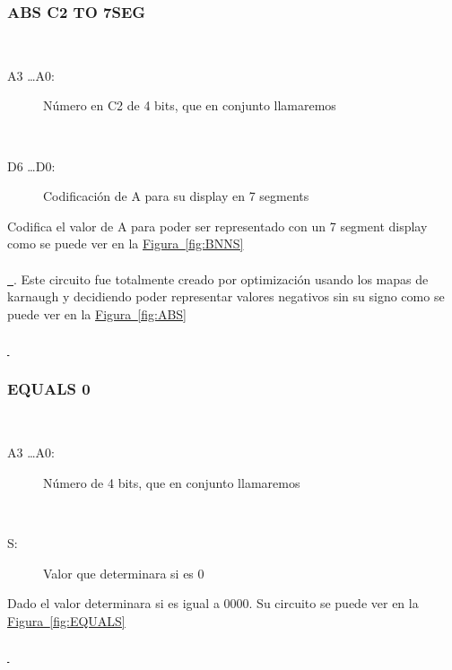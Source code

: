 \documentclass{article}
\newcommand*{\figref}[2][]{
  \hyperref[{fig:#2}]{
    Figura~\ref*{fig:#2}
    \ifx\\#1\\%
    \else
      \,#1
    \fi
  }
}
\begin{document}
\newpage
\subsubsection{ABS C2 TO 7SEG}
\label{sec:ABS7SEG}
\begin{description}
    \item[Entradas: ] 
    \begin{description}
        \item[A3 \dots A0:] Número en C2 de 4 bits, que en conjunto llamaremos 
    \end{description}
    
    \item[Salidas: ] 
    \begin{description}
        \item[D6 \dots D0:] Codificación de A para su display en 7 segments 
    \end{description}
    
    \item[Función: ] Codifica el valor de A para poder ser representado con un 7 segment display como se puede ver en la \figref{BNNS}. Este circuito fue totalmente creado por optimización usando los mapas de karnaugh y decidiendo poder representar valores negativos sin su signo como se puede ver en la \figref{ABS} 
    
\end{description}


\subsubsection{EQUALS 0}
\label{sec:EQUALS}
\begin{description}
    \item[Entradas: ] 
    \begin{description}
          \item[A3 \dots A0:] Número de 4 bits, que en conjunto llamaremos 
    \end{description}
    
    \item[Salidas: ] 
    \begin{description}
        \item[S: ] Valor que determinara si  es 0
    \end{description}
    
    \item[Función: ] Dado el valor  determinara si es igual a 0000. Su circuito se puede ver en la \figref{EQUALS}
    
\end{description}
\end{document}
